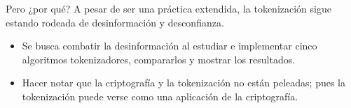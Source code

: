\begin{frame}{Pero ¿por qué?}
  A pesar de ser una práctica extendida, la tokenización sigue estando
  rodeada de desinformación y desconfianza.
  \begin{itemize}
    \item Se busca combatir la desinformación al estudiar e implementar cinco
      algoritmos tokenizadores, compararlos y mostrar los resultados.
    \item Hacer notar que la criptografía y la tokenización no están peleadas;
      pues la tokenización puede verse como una aplicación de la criptografía.
  \end{itemize}
\end{frame}
